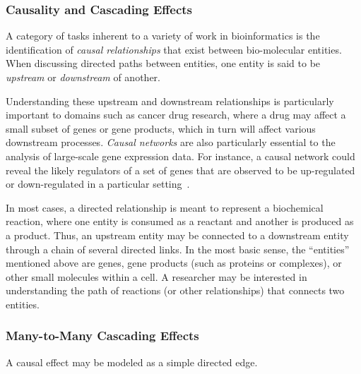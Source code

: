 \documentclass[journal]{vgtc}                %
\begin{document}
\subsubsection{Causality and Cascading Effects}



A category of tasks inherent to a variety of work in bioinformatics is the identification of \textit{causal relationships} that exist between bio-molecular entities.
When discussing directed paths between entities, one entity is said to be \emph{upstream} or \emph{downstream} of another.

Understanding these upstream and downstream relationships is particularly important to domains such as cancer drug research, where a drug may affect a small subset of genes or gene products, which in turn will affect various downstream processes.
\emph{Causal networks} are also particularly essential to the analysis of large-scale gene expression data.
For instance, a causal network could reveal the likely regulators of a set of genes that are observed to be up-regulated or down-regulated in a particular setting~\cite{felciano2013predictive, Kramer2013ipa-causal}.

In most cases, a directed relationship is meant to represent a biochemical reaction, where one entity is consumed as a reactant and another is produced as a product.
Thus, an upstream entity may be connected to a downstream entity through a chain of several directed links.
In the most basic sense, the ``entities'' mentioned above are genes, gene products (such as proteins or complexes), or other small molecules within a cell.
A researcher may be interested in understanding the path of reactions (or other relationships) that connects two entities.

\subsubsection{Many-to-Many Cascading Effects}

A causal effect may be modeled as a simple directed edge.

\end{document}
